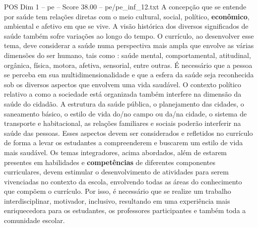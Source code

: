 \begin{textsample}{POS Dim 1 – pe – Score 38.00 – pe/pe\_inf\_12.txt}
A concepção que se entende por saúde tem relações diretas com o meio cultural, social, político, \textbf{econômico}, ambiental e afetivo em que se vive.
A visão histórica dos diversos significados de saúde também sofre variações ao longo do tempo.
O currículo, ao desenvolver esse tema, deve considerar a saúde numa perspectiva mais ampla que envolve as várias dimensões do ser humano, tais como : saúde mental, comportamental, atitudinal, orgânica, física, motora, afetiva, sensorial, entre outras.
É necessário que a pessoa se perceba em sua multidimensionalidade e que a esfera da saúde seja reconhecida sob os diversos aspectos que envolvem uma vida saudável.
O contexto político relativo a como a sociedade está organizada também interfere na dimensão da saúde do cidadão.
A estrutura da saúde pública, o planejamento das cidades, o saneamento básico, o estilo de vida do/no campo ou da/na cidade, o sistema de transporte e habitacional, as relações familiares e sociais poderão interferir na saúde das pessoas.
Esses aspectos devem ser considerados e refletidos no currículo de forma a levar os estudantes a compreenderem e buscarem um estilo de vida mais saudável.
Os temas integradores, acima abordados, além de estarem presentes em habilidades e \textbf{competências} de diferentes componentes curriculares, devem estimular o desenvolvimento de atividades para serem vivenciadas no contexto da escola, envolvendo todas as áreas do conhecimento que compõem o currículo.
Por isso, é necessário que se realize um trabalho interdisciplinar, motivador, inclusivo, resultando em uma experiência mais enriquecedora para os estudantes, os professores participantes e também toda a comunidade escolar.

\end{textsample}
